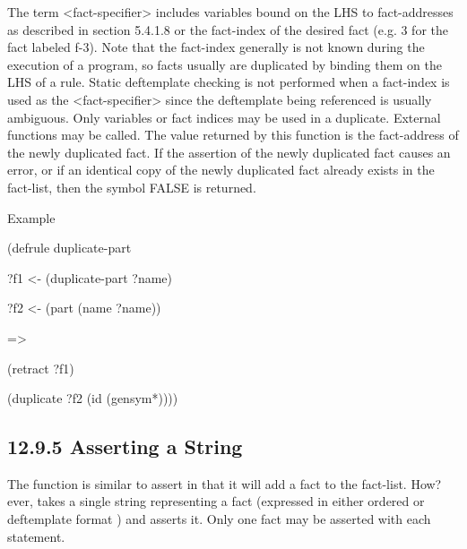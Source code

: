 \documentclass[letterpaper,10pt,english]{sphinxmanual}
\begin{document}

\begin{sphinxVerbatim}[commandchars=\\\{\}]
  
\end{sphinxVerbatim}

The term \textless{}fact-specifier\textgreater{} includes variables bound on the LHS to
fact-addresses as described in section 5.4.1.8 or the fact-index of the
desired fact (e.g. 3 for the fact labeled f-3). Note that the fact-index
generally is not known during the execution of a program, so facts
usually are duplicated by binding them on the LHS of a rule. Static
deftemplate checking is not performed when a fact-index is used as the
\textless{}fact-specifier\textgreater{} since the deftemplate being referenced is usually
ambiguous. Only variables or fact indices may be used in a duplicate.
External functions may  be called. The value returned by this
function is the fact-address of the newly duplicated fact. If the
assertion of the newly duplicated fact causes an error, or if an
identical copy of the newly duplicated fact already exists in the
fact-list, then the symbol FALSE is returned.

Example

\begin{DUlineblock}{0em}
\item[] (defrule duplicate-part
\item[] ?f1 \textless{}- (duplicate-part ?name)
\item[] ?f2 \textless{}- (part (name ?name))
\item[] =\textgreater{}
\item[] (retract ?f1)
\item[] (duplicate ?f2 (id (gensym*))))
\end{DUlineblock}


\subsection{12.9.5 Asserting a String}
\label{\detokenize{actions:asserting-a-string}}
The  function is similar to assert in that it will add
a fact to the fact-list. How?ever,  takes a single
string representing a fact (expressed in either ordered or deftemplate
format ) and asserts it. Only one fact may be asserted with each
 statement.
\end{document}
